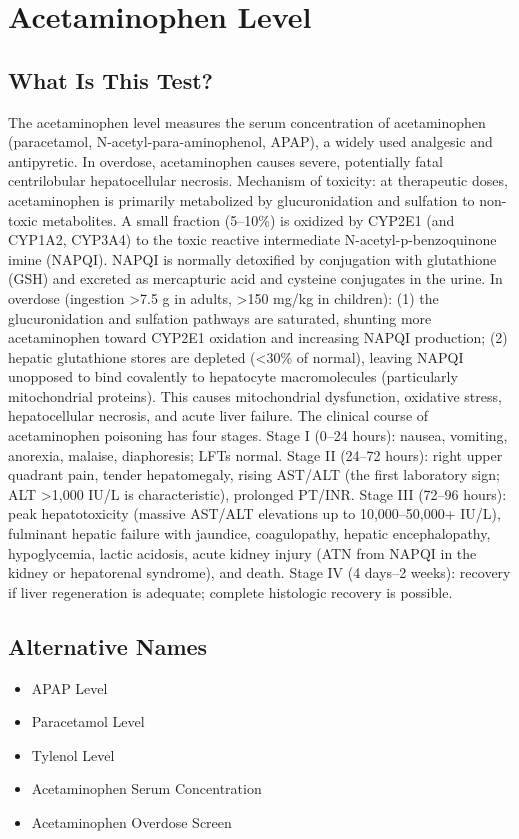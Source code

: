 \chapter{Acetaminophen Level}
\section*{What Is This Test?}
The acetaminophen level measures the serum concentration of acetaminophen (paracetamol, N-acetyl-para-aminophenol, APAP), a widely used analgesic and antipyretic. In overdose, acetaminophen causes severe, potentially fatal centrilobular hepatocellular necrosis. Mechanism of toxicity: at therapeutic doses, acetaminophen is primarily metabolized by glucuronidation and sulfation to non-toxic metabolites. A small fraction (5--10\%) is oxidized by CYP2E1 (and CYP1A2, CYP3A4) to the toxic reactive intermediate N-acetyl-p-benzoquinone imine (NAPQI). NAPQI is normally detoxified by conjugation with glutathione (GSH) and excreted as mercapturic acid and cysteine conjugates in the urine. In overdose (ingestion >7.5 g in adults, >150 mg/kg in children): (1) the glucuronidation and sulfation pathways are saturated, shunting more acetaminophen toward CYP2E1 oxidation and increasing NAPQI production; (2) hepatic glutathione stores are depleted (<30\% of normal), leaving NAPQI unopposed to bind covalently to hepatocyte macromolecules (particularly mitochondrial proteins). This causes mitochondrial dysfunction, oxidative stress, hepatocellular necrosis, and acute liver failure. The clinical course of acetaminophen poisoning has four stages. Stage I (0--24 hours): nausea, vomiting, anorexia, malaise, diaphoresis; LFTs normal. Stage II (24--72 hours): right upper quadrant pain, tender hepatomegaly, rising AST/ALT (the first laboratory sign; ALT >1,000 IU/L is characteristic), prolonged PT/INR. Stage III (72--96 hours): peak hepatotoxicity (massive AST/ALT elevations up to 10,000--50,000+ IU/L), fulminant hepatic failure with jaundice, coagulopathy, hepatic encephalopathy, hypoglycemia, lactic acidosis, acute kidney injury (ATN from NAPQI in the kidney or hepatorenal syndrome), and death. Stage IV (4 days--2 weeks): recovery if liver regeneration is adequate; complete histologic recovery is possible.
\section*{Alternative Names}
\begin{itemize}
  \item APAP Level
  \item Paracetamol Level
  \item Tylenol Level
  \item Acetaminophen Serum Concentration
  \item Acetaminophen Overdose Screen
\end{itemize}
